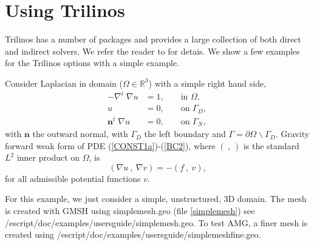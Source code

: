 
%
%
%

\chapter{Using Trilinos}
\label{TRILINOS}
Trilinos has a number of packages and provides a large collection of both direct and indirect solvers.  We refer the reader to \cite{TrilinosWeb} for detais.   We show a few examples for the Trilinos options with a simple example.

Consider Laplacian in domain ($\Omega\in \mathbb{R}^3$) with a simple right hand side,
\begin{align}
 -\nabla^t\; \nabla u &= 1,  &&\text{ in } \Omega, \label{CONST1a}\\
 u &= 0, &&\text{ on } \Gamma_D,\label{BC1}\\
 \mathbf{n}^t \; \nabla u &= 0, &&\text{ on }\Gamma_N,\,\label{BC2}
\end{align} 
with $\mathbf{n}$ the outward normal, with $\Gamma_D$ the left boundary and $\Gamma=\partial\Omega\backslash\Gamma_D$.  Gravity forward weak form of PDE (\ref{CONST1a})-(\ref{BC2}), where $(~,~)$ is the standard $L^2$ inner product on $\Omega$, is
\begin{equation}\label{weak}
(\nabla u ~,~\nabla v ) = -(f ~,~v ),   
\end{equation}
for all admissible potential functions $v$. 


For this example, we just consider a simple, unstructured, 3D domain.  The mesh is created with GMSH using simplemesh.geo (file \ref{simplemesh}) see /escript/doc/examples/usersguide/simplemesh.geo.  To test AMG, a finer mesh is created using    /escript/doc/examples/usersguide/simplemeshfine.geo.

